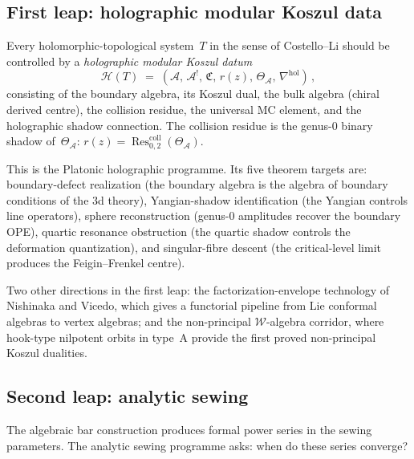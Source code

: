 \documentclass[11pt,reqno]{amsart}
\theoremstyle{definition}
\theoremstyle{remark}
\newcommand{\cA}{\mathcal{A}}
\newcommand{\cH}{\mathcal{H}}
\newcommand{\Res}{\operatorname{Res}}
\numberwithin{equation}{section}
\newcommand{\cW}{\mathcal{W}}
\begin{document}
\subsection{First leap: holographic modular Koszul data}
\label{ssec:holographic}

Every holomorphic-topological system~$T$ in the sense of
Costello--Li should be controlled by a \emph{holographic
modular Koszul datum}
\begin{equation}\label{eq:holographic-datum}
\cH(T)
\;=\;
(\cA,\, \cA^!,\, \mathfrak{C},\, r(z),\,
\Theta_\cA,\, \nabla^{\mathrm{hol}})\,,
\end{equation}
consisting of the boundary algebra, its Koszul dual, the
bulk algebra (chiral derived centre), the collision
residue, the universal MC element, and the holographic
shadow connection. The collision residue is the genus-$0$
binary shadow of~$\Theta_\cA$:
$r(z) = \Res^{\mathrm{coll}}_{0,2}(\Theta_\cA)$.

This is the Platonic holographic programme. Its five
theorem targets are: boundary-defect realization (the
boundary algebra is the algebra of boundary conditions
of the $3$d theory), Yangian-shadow identification (the
Yangian controls line operators), sphere reconstruction
(genus-$0$ amplitudes recover the boundary OPE), quartic
resonance obstruction (the quartic shadow controls the
deformation quantization), and singular-fibre descent (the
critical-level limit produces the Feigin--Frenkel centre).

Two other directions in the first leap: the
factorization-envelope technology of Nishinaka and Vicedo,
which gives a functorial pipeline from Lie conformal
algebras to vertex algebras; and the non-principal
$\cW$-algebra corridor, where hook-type nilpotent orbits
in type~A provide the first proved non-principal Koszul
dualities.


\subsection{Second leap: analytic sewing}
\label{ssec:sewing-frontier}

The algebraic bar construction produces formal power
series in the sewing parameters. The analytic sewing
programme asks: when do these series converge?
\end{document}
